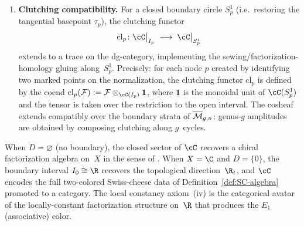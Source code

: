 \begin{definition}
\begin{enumerate}[label=\textup{(\roman*)}]
\item \textbf{Clutching compatibility.} For a closed boundary
 circle $S^1_p$ (i.e.\ restoring the tangential basepoint
 $\tau_p$), the clutching functor
 \[
 \mathrm{cl}_p \colon
 \cC\big|_{I_p} \;\longrightarrow\;
 \cC\big|_{S^1_p}
 \]
 extends to a trace on the dg-category, implementing the
 sewing/factorization-homology gluing along~$S^1_p$.
 Precisely: for each node $p$ created by identifying two marked
 points on the normalization, the clutching functor $\mathrm{cl}_p$
 is defined by the coend
 $\mathrm{cl}_p(\mathcal{F}) := \mathcal{F} \otimes_{\cC(I_p)} \mathbf{1}$,
 where $\mathbf{1}$ is the monoidal unit of $\cC(S^1_p)$ and
 the tensor is taken over the restriction to the open interval.
 The
 cosheaf extends compatibly over the boundary strata of
 $\overline{\mathcal M}_{g,n}$: genus-$g$ amplitudes are obtained by
 composing clutching along $g$~cycles.
\end{enumerate}
\end{definition}

\begin{remark}
\label{rem:oc-vs-known}
When $D = \varnothing$ (no boundary), the closed sector of
$\cC$ recovers a chiral factorization algebra on~$X$ in the
sense of \cite{BD04,CG17}. When $X = \C$ and $D = \{0\}$,
the boundary interval $I_0 \cong \R$ recovers the topological
direction~$\R_t$, and $\cC$ encodes the full two-colored
Swiss-cheese data of Definition~\ref{def:SC-algebra} promoted
to a category. The local constancy axiom~(iv) is the
categorical avatar of the locally-constant factorization
structure on~$\R$ that produces the $E_1$ (associative) color.
\end{remark}

